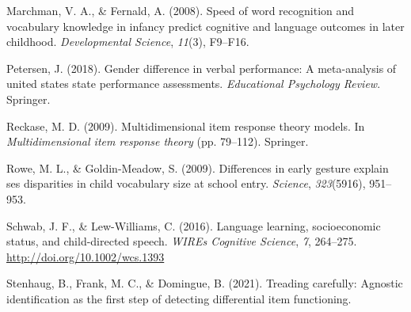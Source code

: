 \documentclass[10pt, letterpaper]{article}
\begin{document}
\leavevmode\hypertarget{ref-marchman2008speed}{}%
Marchman, V. A., \& Fernald, A. (2008). Speed of word recognition and
vocabulary knowledge in infancy predict cognitive and language outcomes
in later childhood. \emph{Developmental Science}, \emph{11}(3), F9--F16.

\leavevmode\hypertarget{ref-petersen2018gender}{}%
Petersen, J. (2018). Gender difference in verbal performance: A
meta-analysis of united states state performance assessments.
\emph{Educational Psychology Review}. Springer.

\leavevmode\hypertarget{ref-reckase2009}{}%
Reckase, M. D. (2009). Multidimensional item response theory models. In
\emph{Multidimensional item response theory} (pp. 79--112). Springer.

\leavevmode\hypertarget{ref-rowe2009differences}{}%
Rowe, M. L., \& Goldin-Meadow, S. (2009). Differences in early gesture
explain ses disparities in child vocabulary size at school entry.
\emph{Science}, \emph{323}(5916), 951--953.

\leavevmode\hypertarget{ref-schwab2016}{}%
Schwab, J. F., \& Lew-Williams, C. (2016). Language learning,
socioeconomic status, and child-directed speech. \emph{WIREs Cognitive
Science}, \emph{7}, 264--275. \url{http://doi.org/10.1002/wcs.1393}

\leavevmode\hypertarget{ref-stenhaug2021treading}{}%
Stenhaug, B., Frank, M. C., \& Domingue, B. (2021). Treading carefully:
Agnostic identification as the first step of detecting differential item
functioning.


\end{document}
